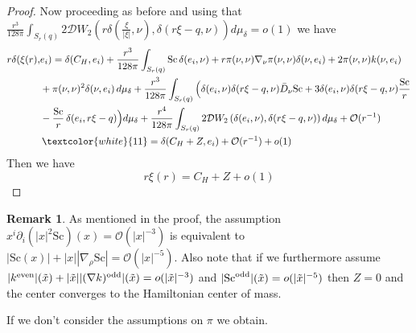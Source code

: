 \documentclass[12pt,a4paper]{amsart}
\theoremstyle{plain}
\theoremstyle{definition}
\newtheorem{remark}[theorem]{Remark}
\begin{document}
\begin{proof}
Now proceeding as before  and using that $\frac{r^3}{128 \pi}  \int_{S_{r}(q)}   2 \mathcal{D}W_2\left( r \delta( \frac{\xi}{|\xi|}, \nu ),  \delta( r\xi-q, \nu )\right) d\mu_{\delta}=o(1) $ we have 
\begin{equation}
    \begin{split}
        r \delta(  \xi(r),& e_i ) =  \delta(  C_H, e_i )+ \frac{r^3}{128 \pi}  \int_{S_r(q)} \mathrm{Sc} \, \delta( e_i, \nu ) + r \pi(\nu, \nu)   \nabla_{\nu}\pi(\nu,\nu) \delta( \nu, e_i) +2  \pi(\nu, \nu)    k (\nu, e_i) \\
           &+    \pi(\nu, \nu)^2 \delta( \nu, e_i)   \, d\mu_{\delta} + \frac{r^3}{128 \pi}  \int_{S_r(q)}  \Big(  \delta( e_i, \nu )  \delta(  r \xi -q, \nu ) \Bar{D}_{\nu} \mathrm{Sc} +3 \delta( e_i, \nu ) \delta(    r \xi -q, \nu )  \frac{\mathrm{Sc} }{r} \\
        & -\frac{\mathrm{Sc} }{r} \, \delta( e_i, r \xi -q ) \Big) d\mu_{\delta} +\frac{r^4}{128 \pi}  \int_{S_{r}(q)}   2 \mathcal{D}W_2\left( \delta( e_i, \nu ), \delta(    r \xi -q, \nu )  \right) d\mu_{\delta} + \mathcal{O}(r^{-1}) \\
       &\, \textcolor{white}{11} = \delta(  C_H +Z, e_i )+ \mathcal{O}(r^{-1}) + o(1)
    \end{split}
\end{equation}
Then we have 
\begin{equation}
  r \xi(r) = C_H + Z +o(1)
\end{equation}
\end{proof}
\begin{remark}
    As mentioned in the proof, the assumption $x^i \partial_i (| x|^2 \mathrm{Sc})(x) = \mathcal{O}( | x|^{-3})$ is equivalent to  $|\mathrm{Sc}( x)| +|x | |\nabla_{\rho }\mathrm{Sc}|  = \mathcal{O}(|x|^{-5})$. Also note that if we furthermore assume  $ |k^{\text{even}}|(\Tilde{x}) + |\Tilde{x}||(\nabla k)^{\text{odd}}|(\Tilde{x}) = o(|\Tilde{x}|^{-3}) $ and $ |\mathrm{Sc}^{\text{odd}} |(\Tilde{x})=o ( |\Tilde{x}|^{-5})$ then $Z=0$ and the center converges to the  Hamiltonian center of mass. 
\end{remark}
If we don't consider the assumptions on $\pi$ we obtain.
\end{document}
